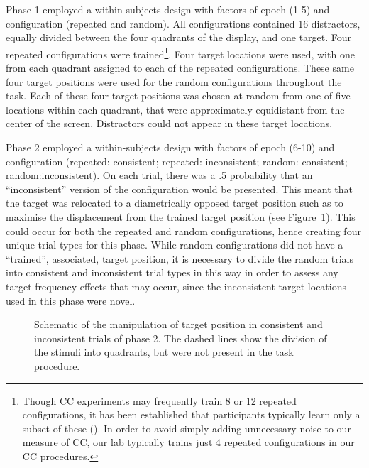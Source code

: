 \documentclass[
  man,
  floatsintext,
  longtable,
  nolmodern,
  notxfonts,
  notimes,
  colorlinks=true,linkcolor=blue,citecolor=blue,urlcolor=blue]{apa7}
\begin{document}
Phase 1 employed a within-subjects design with factors of epoch (1-5)
and configuration (repeated and random). All configurations contained 16
distractors, equally divided between the four quadrants of the display,
and one target. Four repeated configurations were trained\footnote{Though
  CC experiments may frequently train 8 or 12 repeated configurations,
  it has been established that participants typically learn only a
  subset of these (). In
  order to avoid simply adding unnecessary noise to our measure of CC,
  our lab typically trains just 4 repeated configurations in our CC
  procedures.}. Four target locations were used, with one from each
quadrant assigned to each of the repeated configurations. These same
four target positions were used for the random configurations throughout
the task. Each of these four target positions was chosen at random from
one of five locations within each quadrant, that were approximately
equidistant from the center of the screen. Distractors could not appear
in these target locations.

Phase 2 employed a within-subjects design with factors of epoch (6-10)
and configuration (repeated: consistent; repeated: inconsistent; random:
consistent; random:inconsistent). On each trial, there was a .5
probability that an ``inconsistent'' version of the configuration would
be presented. This meant that the target was relocated to a
diametrically opposed target position such as to maximise the
displacement from the trained target position (see
Figure~\ref{fig-schematic}). This could occur for both the repeated and
random configurations, hence creating four unique trial types for this
phase. While random configurations did not have a ``trained'',
associated, target position, it is necessary to divide the random trials
into consistent and inconsistent trial types in this way in order to
assess any target frequency effects that may occur, since the
inconsistent target locations used in this phase were novel.

\begin{figure}[H]


\caption{\label{fig-schematic}Schematic of the manipulation of target
position in consistent and inconsistent trials of phase 2. The dashed
lines show the division of the stimuli into quadrants, but were not
present in the task procedure.}

\end{figure}%
\end{document}
